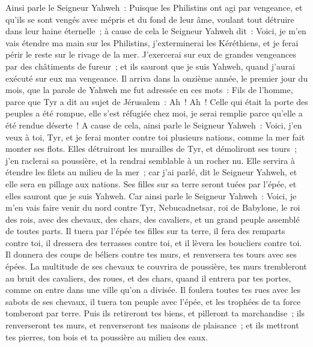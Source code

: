 \begin{multicols}{2}
Ainsi parle le Seigneur Yahweh~: Puisque les Philistins ont agi par vengeance, et qu'ils se sont vengés avec mépris et du fond de leur âme, voulant tout détruire dans leur haine éternelle~;
à cause de cela le Seigneur Yahweh dit~: Voici, je m'en vais étendre ma main sur les Philistins, j'exterminerai les Kéréthiens, et je ferai périr le reste sur le rivage de la mer.
J'exercerai sur eux de grandes vengeances par des châtiments de fureur~; et ils sauront que je suis Yahweh, quand j'aurai exécuté sur eux ma vengeance.
\VerseOne{}Il arriva dans la onzième année, le premier jour du mois, que la parole de Yahweh me fut adressée en ces mots~:
Fils de l'homme, parce que Tyr a dit au sujet de Jérusalem~: Ah~! Ah~! Celle qui était la porte des peuples a été rompue, elle s'est réfugiée chez moi, je serai remplie parce qu'elle a été rendue déserte~!
A cause de cela, ainsi parle le Seigneur Yahweh~: Voici, j'en veux à toi, Tyr, et je ferai monter contre toi plusieurs nations, comme la mer fait monter ses flots.
Elles détruiront les murailles de Tyr, et démoliront ses tours~; j'en raclerai sa poussière, et la rendrai semblable à un rocher nu.
Elle servira à étendre les filets au milieu de la mer~; car j'ai parlé, dit le Seigneur Yahweh, et elle sera en pillage aux nations.
Ses filles sur sa terre seront tuées par l'épée, et elles sauront que je suis Yahweh.
Car ainsi parle le Seigneur Yahweh~: Voici, je m'en vais faire venir du nord contre Tyr, Nebucadnetsar, roi de Babylone, le roi des rois, avec des chevaux, des chars, des cavaliers, et un grand peuple assemblé de toutes parts.
Il tuera par l'épée tes filles sur ta terre, il fera des remparts contre toi, il dressera des terrasses contre toi, et il lèvera les boucliers contre toi.
Il donnera des coups de béliers contre tes murs, et renversera tes tours avec ses épées.
La multitude de ses chevaux te couvrira de poussière, tes murs trembleront au bruit des cavaliers, des roues, et des chars, quand il entrera par tes portes, comme on entre dans une ville qu'on a divisée.
Il foulera toutes tes rues avec les sabots de ses chevaux, il tuera ton peuple avec l'épée, et les trophées de ta force tomberont par terre.
Puis ils retireront tes biens, et pilleront ta marchandise~; ils renverseront tes murs, et renverseront tes maisons de plaisance~; et ils mettront tes pierres, ton bois et ta poussière au milieu des eaux.

\end{multicols}

